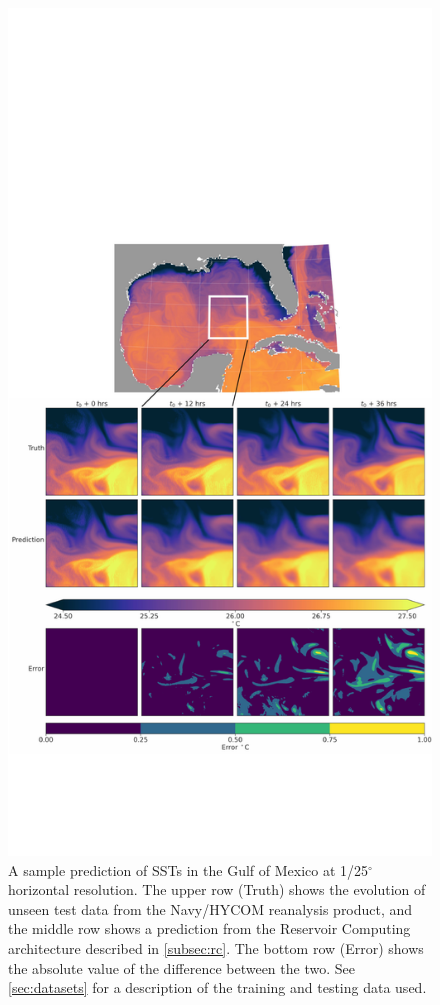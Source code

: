 \begin{figure}
    \centering
    \includegraphics[width=.8\textwidth]{../figures/rc_gom_sst.pdf}
    \caption{A sample prediction of SSTs in the Gulf of Mexico at 1/25$^\circ$
        horizontal resolution.
        The upper row (Truth) shows the evolution of unseen test data from the
        Navy/HYCOM reanalysis product, and the middle row shows a prediction
        from the Reservoir Computing architecture described in
        \cref{subsec:rc}.
        The bottom row (Error) shows the absolute value of the difference between the two.
        See \cref{sec:datasets} for a description of the training and testing data
        used.
    }
    \label{fig:gom_sst}
\end{figure}

